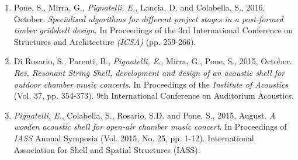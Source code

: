 \begin{publications}
\begin{enumerate}[leftmargin=0.45cm, itemsep=0em, topsep=0.5em, parsep=0.2em]
        \item Pone, S., Mirra, G., \emph{Pignatelli, E.}, Lancia, D. and Colabella, S., 2016, October. \textit{Specialised algorithms for different project stages in a post-formed timber gridshell design}. In Proceedings of the 3rd International Conference on Structures and Architecture \emph{(ICSA)} (pp. 259-266).
        \item Di Rosario, S., Parenti, B., \emph{Pignatelli, E.}, Mirra, G., Pone, S., 2015, October. \textit{Res, Resonant String Shell, development and design of an acoustic shell for outdoor chamber music concerts}. In Proceedings of the \emph{Institute of Acoustics} (Vol. 37, pp. 354-373). 9th International Conference on Auditorium Acoustics.
        \item \emph{Pignatelli, E.}, Colabella, S., Rosario, S.D. and Pone, S., 2015, August. \textit{A wooden acoustic shell for open-air chamber music concert}. In Proceedings of \emph{IASS} Annual Symposia (Vol. 2015, No. 25, pp. 1-12). International Association for Shell and Spatial Structures (IASS).
    \end{enumerate}
    \end{publications}